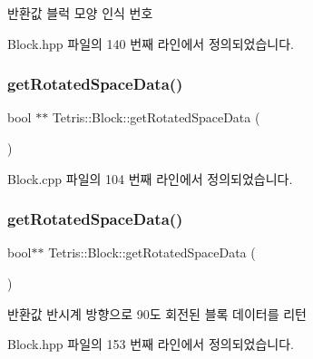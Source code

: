 \begin{DoxyReturn}{반환값}
블럭 모양 인식 번호 
\end{DoxyReturn}


Block.\+hpp 파일의 140 번째 라인에서 정의되었습니다.

\mbox{\label{class_tetris_1_1_block_a464ed776185993ad827f316a08969960}} 
\subsubsection{\texorpdfstring{get\+Rotated\+Space\+Data()}{getRotatedSpaceData()}\hspace{0.1cm}{\footnotesize\ttfamily [1/2]}}
{\footnotesize\ttfamily bool $\ast$$\ast$ Tetris\+::\+Block\+::get\+Rotated\+Space\+Data (\begin{DoxyParamCaption}{ }\end{DoxyParamCaption})}



Block.\+cpp 파일의 104 번째 라인에서 정의되었습니다.

\mbox{\label{class_tetris_1_1_block_ada769278572785b24e8a91f620b97b81}} 
\subsubsection{\texorpdfstring{get\+Rotated\+Space\+Data()}{getRotatedSpaceData()}\hspace{0.1cm}{\footnotesize\ttfamily [2/2]}}
{\footnotesize\ttfamily bool$\ast$$\ast$ Tetris\+::\+Block\+::get\+Rotated\+Space\+Data (\begin{DoxyParamCaption}{ }\end{DoxyParamCaption})\hspace{0.3cm}{\ttfamily [inline]}}

\begin{DoxyReturn}{반환값}
반시계 방향으로 90도 회전된 블록 데이터를 리턴 
\end{DoxyReturn}


Block.\+hpp 파일의 153 번째 라인에서 정의되었습니다.

